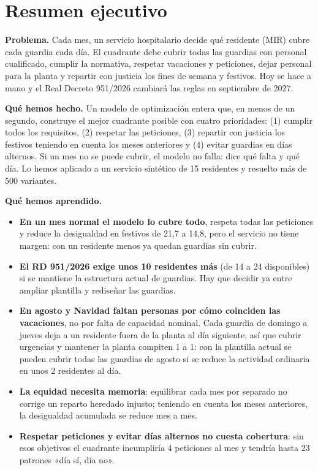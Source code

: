 \section*{Resumen ejecutivo}

\begin{tcolorbox}[colback=navy!4,colframe=navy,boxrule=0.6pt,arc=2pt,left=8pt,right=8pt,top=6pt,bottom=6pt]
\textbf{Problema.} Cada mes, un servicio hospitalario decide qué residente (MIR) cubre cada guardia cada día. El cuadrante debe cubrir todas las guardias con personal cualificado, cumplir la normativa, respetar vacaciones y peticiones, dejar personal para la planta y repartir con justicia los fines de semana y festivos. Hoy se hace a mano y el Real Decreto 951/2026 cambiará las reglas en septiembre de 2027.

\smallskip
\textbf{Qué hemos hecho.} Un modelo de optimización entera que, en menos de un segundo, construye el mejor cuadrante posible con cuatro prioridades: (1) cumplir todos los requisitos, (2) respetar las peticiones, (3) repartir con justicia los festivos teniendo en cuenta los meses anteriores y (4) evitar guardias en días alternos. Si un mes no se puede cubrir, el modelo no falla: dice qué falta y qué día. Lo hemos aplicado a un servicio sintético de 15 residentes y resuelto más de 500 variantes.

\smallskip
\textbf{Qué hemos aprendido.}
\begin{itemize}[leftmargin=14pt]
  \item \textbf{En un mes normal el modelo lo cubre todo}, respeta todas las peticiones y reduce la desigualdad en festivos de 21,7 a 14,8, pero el servicio no tiene margen: con un residente menos ya quedan guardias sin cubrir.
  \item \textbf{El RD 951/2026 exige unos 10 residentes más} (de 14 a 24 disponibles) si se mantiene la estructura actual de guardias. Hay que decidir ya entre ampliar plantilla y rediseñar las guardias.
  \item \textbf{En agosto y Navidad faltan personas por cómo coinciden las vacaciones}, no por falta de capacidad nominal. Cada guardia de domingo a jueves deja a un residente fuera de la planta al día siguiente, así que cubrir urgencias y mantener la planta compiten 1 a 1: con la plantilla actual se pueden cubrir todas las guardias de agosto si se reduce la actividad ordinaria en unos 2 residentes al día.
  \item \textbf{La equidad necesita memoria}: equilibrar cada mes por separado no corrige un reparto heredado injusto; teniendo en cuenta los meses anteriores, la desigualdad acumulada se reduce mes a mes.
  \item \textbf{Respetar peticiones y evitar días alternos no cuesta cobertura}: sin esos objetivos el cuadrante incumpliría 4 peticiones al mes y tendría hasta 23 patrones «día sí, día no».
\end{itemize}
\end{tcolorbox}

\newpage
